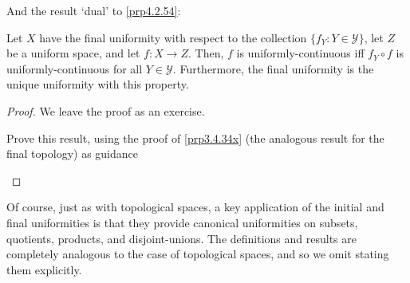 And the result `dual' to \cref{prp4.2.54}:
\begin{prp}
Let $X$ have the final uniformity with respect to the collection $\{ f_Y:Y\in \mathcal{Y}\}$, let $Z$ be a uniform space, and let $f:X\rightarrow Z$.  Then, $f$ is uniformly-continuous iff $f_Y\circ f$ is uniformly-continuous for all $Y\in \mathcal{Y}$.  Furthermore, the final uniformity is the unique uniformity with this property.
\begin{proof}
We leave the proof as an exercise.
\begin{exr}
Prove this result, using the proof of \cref{prp3.4.34x} (the analogous result for the final topology) as guidance 
\end{exr}
\end{proof}
\end{prp}
Of course, just as with topological spaces, a key application of the initial and final uniformities is that they provide canonical uniformities on subsets, quotients, products, and disjoint-unions.  The definitions and results are completely analogous to the case of topological spaces, and so we omit stating them explicitly.

